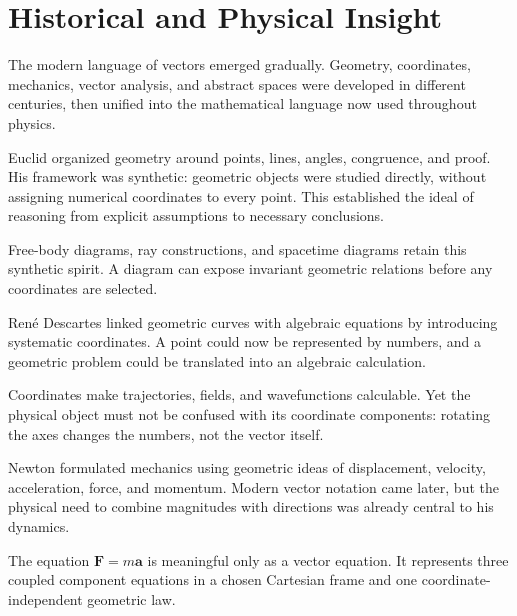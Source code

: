 \section{Historical and Physical Insight}
\label{sec:history-vector-language}

The modern language of vectors emerged gradually. Geometry, coordinates,
mechanics, vector analysis, and abstract spaces were developed in different
centuries, then unified into the mathematical language now used throughout
physics.

\begin{chapterhistorical}
Euclid organized geometry around points, lines, angles, congruence, and proof.
His framework was synthetic: geometric objects were studied directly, without
assigning numerical coordinates to every point. This established the ideal of
reasoning from explicit assumptions to necessary conclusions.
\end{chapterhistorical}
\begin{physicalbox}
Free-body diagrams, ray constructions, and spacetime diagrams retain this
synthetic spirit. A diagram can expose invariant geometric relations before any
coordinates are selected.
\end{physicalbox}

\begin{chapterhistorical}
Ren\'e Descartes linked geometric curves with algebraic equations by introducing
systematic coordinates. A point could now be represented by numbers, and a
geometric problem could be translated into an algebraic calculation.
\end{chapterhistorical}
\begin{physicalbox}
Coordinates make trajectories, fields, and wavefunctions calculable. Yet the
physical object must not be confused with its coordinate components: rotating
the axes changes the numbers, not the vector itself.
\end{physicalbox}

\begin{chapterhistorical}
Newton formulated mechanics using geometric ideas of displacement, velocity,
acceleration, force, and momentum. Modern vector notation came later, but the
physical need to combine magnitudes with directions was already central to his
dynamics.
\end{chapterhistorical}
\begin{physicalbox}
The equation $\mathbf F=m\mathbf a$ is meaningful only as a vector equation.
It represents three coupled component equations in a chosen Cartesian frame and
one coordinate-independent geometric law.
\end{physicalbox}

